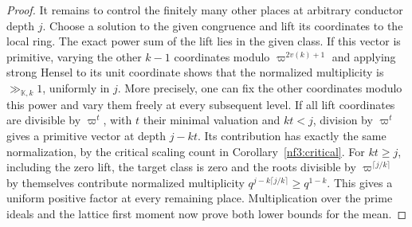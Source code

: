 \documentclass[11pt,letterpaper]{article}
\theoremstyle{definition}
\numberwithin{equation}{section}
\begin{document}
\begin{proof}
It remains to control the finitely many other places at arbitrary
conductor depth $j$. Choose a solution to the given congruence and
lift its coordinates to the local ring. The exact power sum of the
lift lies in the given class. If this vector is primitive, varying
the other $k-1$ coordinates modulo $\varpi^{2v(k)+1}$ and applying
strong Hensel to its unit coordinate shows that the normalized
multiplicity is $\gg_{\mathbb K,k}1$, uniformly in $j$. More precisely,
one can fix the other coordinates modulo this power and vary them freely
at every subsequent level. If all lift coordinates are divisible by
$\varpi^t$, with $t$ their minimal valuation and $kt<j$, division by
$\varpi^t$ gives a primitive vector at depth $j-kt$. Its contribution
has exactly the same normalization, by the critical scaling count in
Corollary~\ref{nf3:critical}. For $kt\ge j$, including the zero lift,
the target class is zero and the roots divisible by
$\varpi^{\lceil j/k\rceil}$ by themselves contribute normalized
multiplicity $q^{j-k\lceil j/k\rceil}\ge q^{1-k}$.
This gives a uniform positive factor at every remaining place.
Multiplication over the prime ideals and the lattice first moment now
prove both lower bounds for the mean.
\end{proof}
\end{document}
